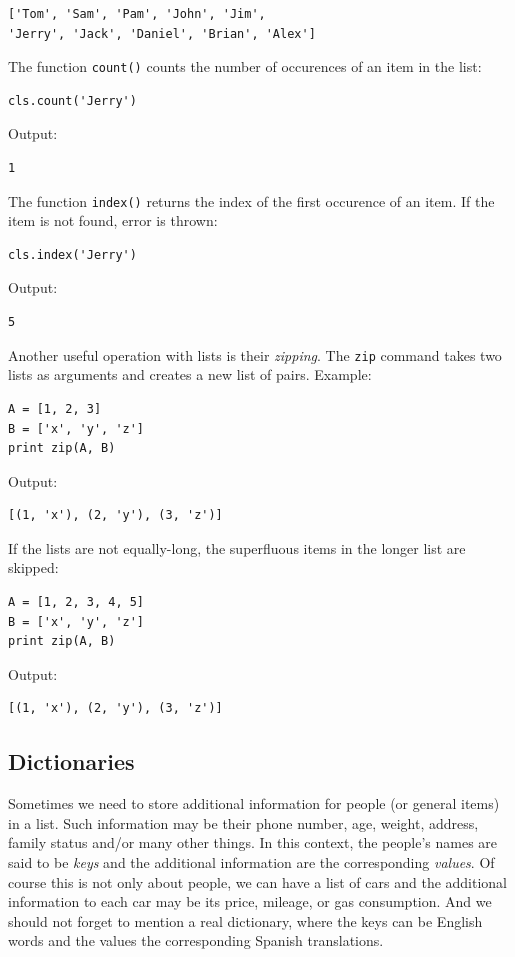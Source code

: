 \begin{verbatim}
['Tom', 'Sam', 'Pam', 'John', 'Jim', 
'Jerry', 'Jack', 'Daniel', 'Brian', 'Alex']
\end{verbatim}
The function {\tt count()} counts the number of occurences of an item
in the list:

\begin{verbatim}
cls.count('Jerry')
\end{verbatim}
Output:

\begin{verbatim}
1
\end{verbatim}
The function {\tt index()} returns the index of the first occurence 
of an item. If the item is not found, error is thrown:

\begin{verbatim}
cls.index('Jerry')
\end{verbatim}
Output:

\begin{verbatim}
5
\end{verbatim}
Another useful operation with lists is their {\em zipping}. The {\tt zip} command takes two lists as arguments 
and creates a new list of pairs. Example:

\begin{verbatim}
A = [1, 2, 3]
B = ['x', 'y', 'z']
print zip(A, B)
\end{verbatim}
Output:

\begin{verbatim}
[(1, 'x'), (2, 'y'), (3, 'z')]
\end{verbatim}
If the lists are not equally-long, the superfluous items in the longer list 
are skipped:

\begin{verbatim}
A = [1, 2, 3, 4, 5]
B = ['x', 'y', 'z']
print zip(A, B)
\end{verbatim}
Output:

\begin{verbatim}
[(1, 'x'), (2, 'y'), (3, 'z')]
\end{verbatim}

\subsection{Dictionaries}

Sometimes we need to store additional information for 
people (or general items) in a list. Such information may be  
their phone number, age, weight, address, family 
status and/or many other things. In this context, the 
people's names are said to be {\em keys} and the additional 
information are the corresponding {\em values}. Of course this 
is not only about people, we can have a list of cars and the 
additional information to each car may be its price, mileage, or
gas consumption. And we should not forget to mention a real 
dictionary, where the keys can be English words and the values the 
corresponding Spanish translations.


